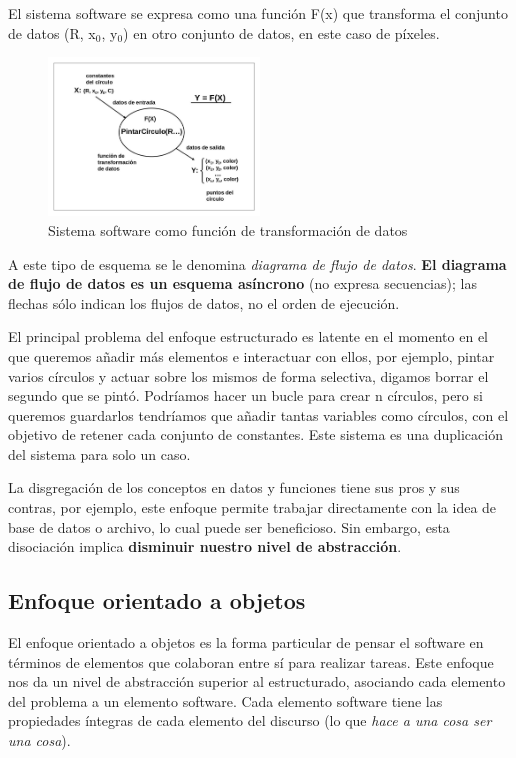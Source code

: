 El sistema software se expresa como una función F(x) que transforma el
conjunto de datos (R, x\(_{\text{0}}\), y\(_{\text{0}}\)) en otro
conjunto de datos, en este caso de píxeles.

\begin{figure}[ht!]  \centering
  \includegraphics[width=0.5\textwidth]{images/fig12}
  \caption{Sistema software como función de transformación de datos}
  \label{fig:12}
\end{figure}

A este tipo de esquema se le denomina \emph{diagrama de flujo de
  datos}. \textbf{El diagrama de flujo de datos es un esquema asíncrono}
(no expresa secuencias); las flechas sólo indican los flujos de datos,
no el orden de ejecución.

\vspace{5mm}

El principal problema del enfoque estructurado es latente en el
momento en el que queremos añadir más elementos e interactuar con
ellos, por ejemplo, pintar varios círculos y actuar sobre los mismos
de forma selectiva, digamos borrar el segundo que se pintó.  Podríamos
hacer un bucle para crear n círculos, pero si queremos guardarlos
tendríamos que añadir tantas variables como círculos, con el objetivo
de retener cada conjunto de constantes. Este sistema es una
duplicación del sistema para solo un caso.

\vspace{5mm}

La disgregación de los conceptos en datos y funciones tiene sus pros y
sus contras, por ejemplo, este enfoque permite trabajar directamente
con la idea de base de datos o archivo, lo cual puede ser
beneficioso. Sin embargo, esta disociación implica \textbf{disminuir
  nuestro nivel de abstracción}.
\subsection{Enfoque orientado a objetos}
\label{sec:orgab1dc13} El enfoque orientado a objetos es la forma
particular de pensar el software en términos de elementos que
colaboran entre sí para realizar tareas.  Este enfoque nos da un nivel
de abstracción superior al estructurado, asociando cada elemento del
problema a un elemento software.  Cada elemento software tiene las
propiedades íntegras de cada elemento del discurso (lo que \emph{hace
  a una cosa ser una cosa}).
